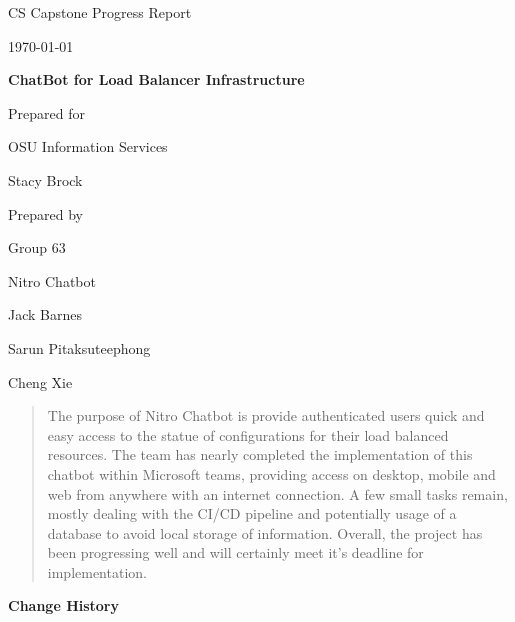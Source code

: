 \documentclass[onecolumn, draftclsnofoot,10pt, compsoc]{IEEEtran}
\def \CapstoneTeamName{		    Nitro Chatbot}
\def \CapstoneTeamNumber{		63}
\def \GroupMemberOne{			Jack Barnes}
\def \GroupMemberTwo{			Sarun Pitaksuteephong}
\def \GroupMemberThree{			Cheng Xie}
\def \CapstoneProjectName{		ChatBot for Load Balancer Infrastructure}
\def \CapstoneSponsorCompany{	OSU Information Services}
\def \CapstoneSponsorPerson{	Stacy Brock}
\def \DocType{	%
				Progress Report
				}
\newcommand{\NameSigPair}[1]{\par
\makebox[2.75in][r]{#1} \hfil 	\makebox[3.25in]{\makebox[2.25in]{\hrulefill} \hfill		\makebox[.75in]{\hrulefill}}
\par\vspace{-12pt} \textit{\tiny\noindent
\makebox[2.75in]{} \hfil		\makebox[3.25in]{\makebox[2.25in][r]{Signature} \hfill	\makebox[.75in][r]{Date}}}}
\renewcommand{\NameSigPair}[1]{#1}
\begin{document}
\begin{titlepage}
    \begin{singlespace}
        \hfill 
        \par\vspace{.2in}
        \centering
        \scshape{
            \huge CS Capstone \DocType \par
            {\large\today}\par
            \vspace{.5in}
            \textbf{\Huge\CapstoneProjectName}\par
            \vfill
            \vfill
            {\large Prepared for}\par
            \Huge \CapstoneSponsorCompany\par
            \vspace{5pt}
            {\Large\NameSigPair{\CapstoneSponsorPerson}\par}
            {\large Prepared by }\par
            Group\CapstoneTeamNumber\par
            \CapstoneTeamName\par 
            \vspace{5pt}
            {\Large
                \NameSigPair{\GroupMemberOne}\par
                \NameSigPair{\GroupMemberTwo}\par
                \NameSigPair{\GroupMemberThree}\par
            }
            \vspace{20pt}
        }
        \begin{abstract}
            The purpose of Nitro Chatbot is provide authenticated users quick and easy access to the statue of configurations for their load balanced resources.
            The team has nearly completed the implementation of this chatbot within Microsoft teams, providing access on desktop, mobile and web from anywhere with an internet connection.
            A few small tasks remain, mostly dealing with the CI/CD pipeline and potentially usage of a database to avoid local storage of information.
            Overall, the project has been progressing well and will certainly meet it's deadline for implementation.
        \end{abstract}     
    \end{singlespace}
\end{titlepage}
\newpage
{}
\tableofcontents
\listoffigures
\clearpage
\textbf{Change History}\par
\end{document}
